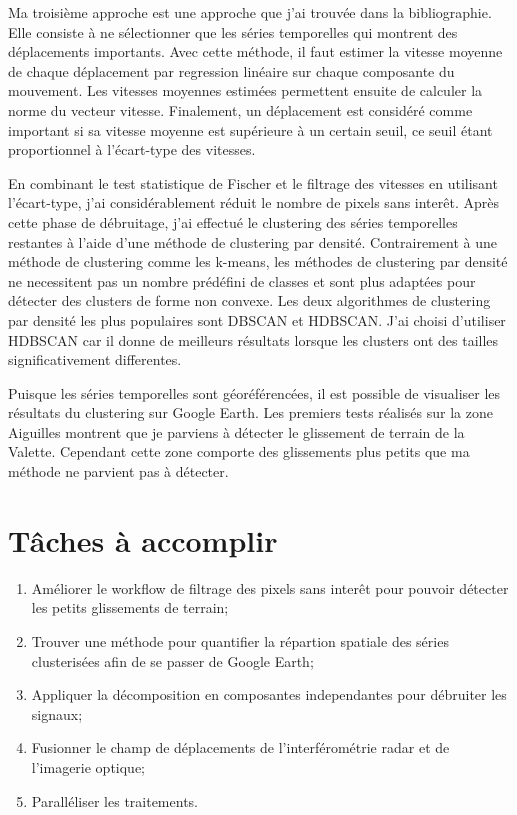 \documentclass[11pt, openany]{report}
\begin{document}
Ma troisième approche est une approche que j'ai trouvée dans la bibliographie. Elle consiste à ne sélectionner que les séries temporelles qui montrent des déplacements 
importants. Avec cette méthode, il faut estimer la vitesse moyenne de chaque déplacement par regression linéaire sur chaque composante du mouvement. Les vitesses moyennes estimées permettent ensuite de calculer la norme du vecteur vitesse. Finalement, un déplacement est considéré comme important si sa vitesse moyenne est supérieure à un certain seuil, ce  seuil étant proportionnel à l'écart-type des vitesses.

En combinant le test statistique de Fischer et le filtrage des vitesses en utilisant l'écart-type, j'ai considérablement réduit le nombre de pixels sans interêt. Après cette phase de débruitage, j'ai effectué le clustering des séries temporelles restantes à l'aide d'une méthode de clustering par densité. Contrairement à une méthode de clustering comme les k-means, les méthodes de clustering par densité ne necessitent pas un nombre prédéfini de classes et sont plus adaptées pour détecter des clusters de forme non convexe. Les deux algorithmes de clustering par densité les plus populaires sont DBSCAN et HDBSCAN. J'ai choisi d'utiliser HDBSCAN car il donne de meilleurs résultats lorsque les clusters ont des tailles significativement differentes.

Puisque les séries temporelles sont géoréférencées, il est possible de visualiser les résultats du clustering sur Google Earth. Les premiers tests réalisés sur la zone Aiguilles montrent que je parviens à détecter le glissement de terrain de la Valette. Cependant cette zone comporte des glissements plus petits que ma méthode ne parvient pas à détecter.
   
\section{Tâches à accomplir}
\begin{enumerate}
\item Améliorer le workflow de filtrage des pixels sans interêt pour pouvoir détecter les petits glissements de terrain;
\item Trouver une méthode pour quantifier la répartion spatiale des séries clusterisées afin de se passer de Google Earth;
\item Appliquer la décomposition en composantes independantes pour débruiter les signaux;
\item Fusionner le champ de déplacements de l'interférométrie radar et de l'imagerie optique;
\item Paralléliser les traitements.
\end{enumerate}
	
\end{document}
